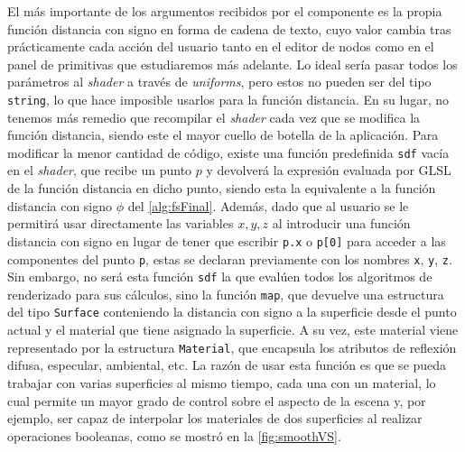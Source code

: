 El  más importante de los argumentos recibidos por el componente es la propia función distancia con signo en forma de cadena de texto, cuyo valor cambia tras prácticamente cada acción del usuario tanto en el editor de nodos como en el panel de primitivas que estudiaremos más adelante. Lo ideal sería pasar todos los parámetros al \textit{shader} a través de \textit{uniforms}, pero estos no pueden ser del tipo \texttt{string}, lo que hace imposible usarlos para la función distancia. En su lugar, no tenemos más remedio que recompilar el \textit{shader} cada vez que se modifica la función distancia, siendo este el mayor cuello de botella de la aplicación. Para modificar la menor cantidad de código, existe una función predefinida \texttt{sdf} vacía en el \textit{shader}, que recibe un punto $p$ y devolverá la expresión evaluada por GLSL de la función distancia en dicho punto, siendo esta la equivalente a la función distancia con signo $\phi$ del \autoref{alg:fsFinal}. Además, dado que al usuario se le permitirá usar directamente las variables $x,y,z$ al introducir una función distancia con signo en lugar de tener que escribir \texttt{p.x} o \texttt{p[0]} para acceder a las componentes del punto \texttt{p}, estas se declaran previamente con los nombres \texttt{x}, \texttt{y}, \texttt{z}. Sin embargo, no será esta función \texttt{sdf} la que evalúen todos los algoritmos de renderizado para sus cálculos, sino la función \texttt{map}, que devuelve una estructura del tipo \texttt{Surface} conteniendo la distancia con signo a la superficie desde el punto actual y el material que tiene asignado la superficie. A su vez, este material viene representado por la estructura \texttt{Material}, que encapsula los atributos de reflexión difusa, especular, ambiental, etc. La razón de usar esta función es que se pueda trabajar con varias superficies al mismo tiempo, cada una con un material, lo cual permite un mayor grado de control sobre el aspecto de la escena y, por ejemplo, ser capaz de interpolar los materiales de dos superficies al realizar operaciones booleanas, como se mostró en la \autoref{fig:smoothVS}.\newline


